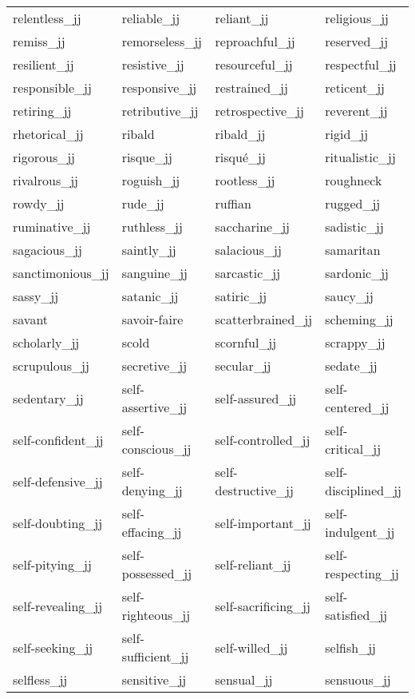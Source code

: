 \begin{longtable}[tbp]{| llll |}
   relentless\_jj & reliable\_jj & reliant\_jj & religious\_jj \\
   remiss\_jj & remorseless\_jj & reproachful\_jj & reserved\_jj \\
   resilient\_jj & resistive\_jj & resourceful\_jj & respectful\_jj \\
   responsible\_jj & responsive\_jj & restrained\_jj & reticent\_jj \\
   retiring\_jj & retributive\_jj & retrospective\_jj & reverent\_jj \\
   rhetorical\_jj & ribald & ribald\_jj & rigid\_jj \\
   rigorous\_jj & risque\_jj & risqué\_jj & ritualistic\_jj \\
   rivalrous\_jj & roguish\_jj & rootless\_jj & roughneck \\
   rowdy\_jj & rude\_jj & ruffian & rugged\_jj \\
   ruminative\_jj & ruthless\_jj & saccharine\_jj & sadistic\_jj \\
   sagacious\_jj & saintly\_jj & salacious\_jj & samaritan \\
   sanctimonious\_jj & sanguine\_jj & sarcastic\_jj & sardonic\_jj \\
   sassy\_jj & satanic\_jj & satiric\_jj & saucy\_jj \\
   savant & savoir-faire & scatterbrained\_jj & scheming\_jj \\
   scholarly\_jj & scold & scornful\_jj & scrappy\_jj \\
   scrupulous\_jj & secretive\_jj & secular\_jj & sedate\_jj \\
   sedentary\_jj & self-assertive\_jj & self-assured\_jj & self-centered\_jj \\
   self-confident\_jj & self-conscious\_jj & self-controlled\_jj & self-critical\_jj \\
   self-defensive\_jj & self-denying\_jj & self-destructive\_jj & self-disciplined\_jj \\
   self-doubting\_jj & self-effacing\_jj & self-important\_jj & self-indulgent\_jj \\
   self-pitying\_jj & self-possessed\_jj & self-reliant\_jj & self-respecting\_jj \\
   self-revealing\_jj & self-righteous\_jj & self-sacrificing\_jj & self-satisfied\_jj \\
   self-seeking\_jj & self-sufficient\_jj & self-willed\_jj & selfish\_jj \\
   selfless\_jj & sensitive\_jj & sensual\_jj & sensuous\_jj \\

\end{longtable}
